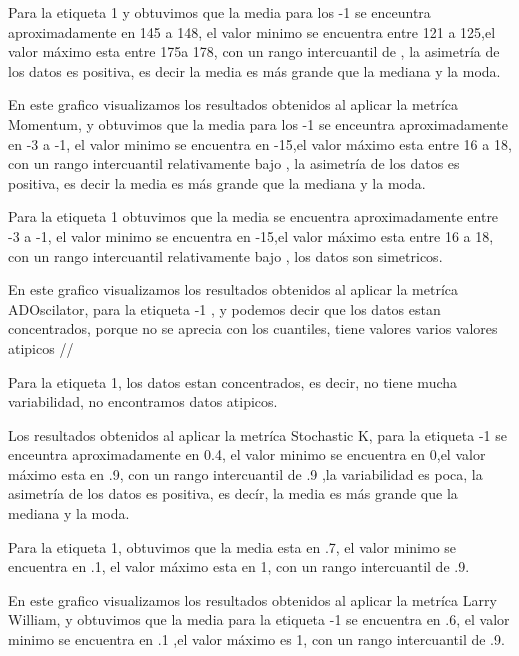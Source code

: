 \documentclass[letter, 12pt]{article}
\begin{document}
Para la etiqueta 1 y obtuvimos que la media para los -1 se enceuntra aproximadamente en 145 a 148, el valor minimo se encuentra entre 121 a 125,el valor máximo esta entre  175a 178, con un rango intercuantil de  , la asimetría de los datos es positiva, es decir la media es más grande que la mediana y la moda.
     \begin{figure}[H]
    \centering
    \end{figure}
En este grafico visualizamos los resultados obtenidos al aplicar la metríca Momentum, y obtuvimos que la media para los -1 se enceuntra aproximadamente en -3 a -1, el valor minimo se encuentra en -15,el valor máximo esta entre  16 a 18, con un rango intercuantil relativamente bajo  , la asimetría de los datos es positiva, es decir la media es más grande que la mediana y la moda.

Para la etiqueta 1 obtuvimos que la media se encuentra  aproximadamente entre -3 a -1, el valor minimo se encuentra en -15,el valor máximo esta entre  16 a 18, con un rango intercuantil relativamente bajo  , los datos son simetricos.
     \begin{figure}[H]
    \centering
    \end{figure}
En este grafico visualizamos los resultados obtenidos al aplicar la metríca ADOscilator, para la etiqueta -1 , y podemos decir que los datos estan concentrados, porque no se aprecia con  los cuantiles, tiene valores varios valores atipicos //

Para la etiqueta 1, los datos estan concentrados, es decir, no tiene mucha variabilidad, no encontramos datos atipicos.
     \begin{figure}[H]
    \centering
    \end{figure}
Los resultados obtenidos al aplicar la metríca Stochastic K, para la etiqueta -1 se enceuntra aproximadamente en 0.4, el valor minimo se encuentra en 0,el valor máximo esta en .9, con un rango intercuantil de .9 ,la variabilidad es poca,  la asimetría de los datos es positiva, es decír, la media es más grande que la mediana y la moda.

Para la etiqueta 1, obtuvimos que la media esta en .7, el valor minimo se encuentra en .1, el valor máximo esta en 1, con un rango intercuantil de .9.
    \begin{figure}[H]
    \centering
    \end{figure}
En este grafico visualizamos los resultados obtenidos al aplicar la metríca Larry William, y obtuvimos que la media para la etiqueta -1 se encuentra en .6, el valor minimo se encuentra en .1 ,el valor máximo es 1, con un rango intercuantil de  .9.\\
\end{document}
